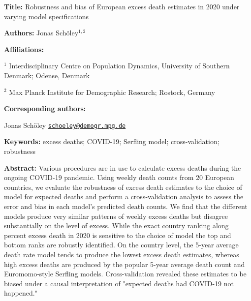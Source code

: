 \documentclass[12pt]{article}
\begin{document}
\begin{titlepage}

{\textbf{Title:}
Robustness and bias of European excess death estimates in 2020 under varying model specifications
\par\medskip}

{\textbf{Authors:}
Jonas Schöley$^{1,2}$
\par\medskip}

{\textbf{Affiliations:}\par
$^1$ Interdisciplinary Centre on Population Dynamics, University of Southern Denmark; Odense, Denmark\par
$^2$ Max Planck Institute for Demographic Research; Rostock, Germany\par
\par\medskip}

{\textbf{Corresponding authors:}\par
Jonas Schöley \href{mailto:schoeley@demogr.mpg.de}{\texttt{schoeley@demogr.mpg.de}}\par
\par\medskip}

{\textbf{Keywords:}
excess deaths; COVID-19; Serfling model; cross-validation; robustness
\par\medskip}

{\textbf{Abstract:}
Various procedures are in use to calculate excess deaths during the ongoing COVID-19 pandemic. Using weekly death counts from 20 European countries, we evaluate the robustness of excess death estimates to the choice of model for expected deaths and perform a cross-validation analysis to assess the error and bias in each model's predicted death counts. We find that the different models produce very similar patterns of weekly excess deaths but disagree substantially on the level of excess. While the exact country ranking along percent excess death in 2020 is sensitive to the choice of model the top and bottom ranks are robustly identified. On the country level, the 5-year average death rate model tends to produce the lowest excess death estimates, whereas high excess deaths are produced by the popular 5-year average death count and Euromomo-style Serfling models. Cross-validation revealed these estimates to be biased under a causal interpretation of "expected deaths had COVID-19 not happened."
\par\medskip}


\end{titlepage}
\end{document}
